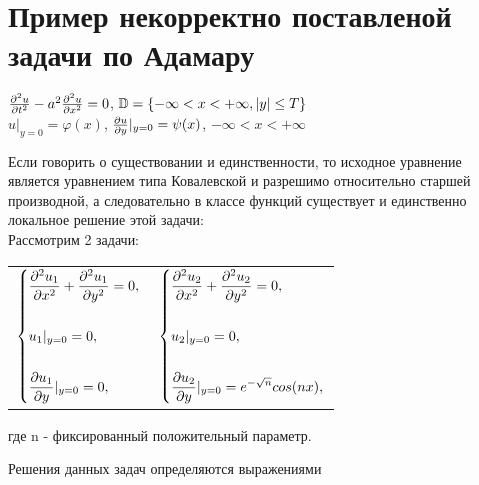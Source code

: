 \documentclass[../main.tex]{subfiles}
\begin{document}
\section{Пример некорректно поставленой задачи по Адамару}
\begin{large}
    \begin{center}
        $\frac{\partial^2 u}{\partial t^2}-a^2\frac{\partial^2 u}{\partial x^2}=0$, $\mathbb{D}=\{ -\infty<x<+\infty, |y|\leq T\rbrace$\\
        $ $\\
        $ u|_{y=0} = \varphi(x)$, $\frac{\partial u}{\partial y}|_{y=0} = \psi(x)$, $ -\infty<x<+\infty$\\ 
        $ $\\
    \end{center}
\end{large}

Если говорить о существовании и единственности, то исходное уравнение является уравнением типа Ковалевской и разрешимо относительно старшей производной, а следовательно в классе функций существует и единственно локальное решение этой задачи:\\

Рассмотрим 2 задачи:\\

\begin{center}

    \begin{tabular}{c c}
    
    $
    \begin{dcases}
    \frac{\partial^2 u_1}{\partial x^2}+\frac{\partial^2 u_1}{\partial y^2}=0,\\\\
         u_1|_{y=0}=0,\\\\
         \frac{\partial u_1}{\partial y}|_{y=0}=0,
    \end{dcases} $
    &
    $\begin{dcases}
    \frac{\partial^2 u_2}{\partial x^2}+\frac{\partial^2 u_2}{\partial y^2}=0,\\\\
         u_2|_{y=0}=0,\\\\
         \frac{\partial u_2}{\partial y}|_{y=0}=e^{-\sqrt{n}}cos(nx),
    \end{dcases} $
    
    \end{tabular}
    
\end{center}
где n - фиксированный положительный параметр.

Решения данных задач определяются выражениями
\end{document}
